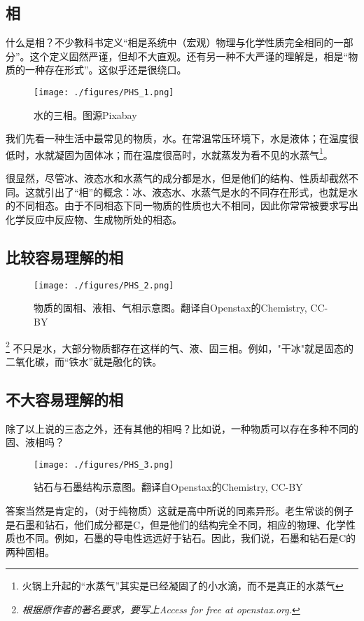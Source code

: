 
\subsection{相}
什么是相？不少教科书定义“相是系统中（宏观）物理与化学性质完全相同的一部分”。这个定义固然严谨，但却不大直观。还有另一种不大严谨的理解是，相是“物质的一种存在形式”。这似乎还是很绕口。

\begin{figure}[ht]
\centering
\texttt{[image: ./figures/PHS\_1.png]}
\caption{水的三相。图源Pixabay} \label{PHS_fig1}
\end{figure}
我们先看一种生活中最常见的物质，水。在常温常压环境下，水是液体；在温度很低时，水就凝固为固体冰；而在温度很高时，水就蒸发为看不见的水蒸气\footnote{火锅上升起的“水蒸气”其实是已经凝固了的小水滴，而不是真正的水蒸气}。

很显然，尽管冰、液态水和水蒸气的成分都是水，但是他们的结构、性质却截然不同。这就引出了“相”的概念：冰、液态水、水蒸气是水的不同存在形式，也就是水的不同相态。由于不同相态下同一物质的性质也大不相同，因此你常常被要求写出化学反应中反应物、生成物所处的相态。

\subsection{比较容易理解的相}
\begin{figure}[ht]
\centering
\texttt{[image: ./figures/PHS\_2.png]}
\caption{物质的固相、液相、气相示意图。翻译自Openstax的Chemistry, CC-BY} \label{PHS_fig2}
\end{figure}
\footnote{\textsl{根据原作者的著名要求，要写上Access for free at openstax.org.}}
不只是水，大部分物质都存在这样的气、液、固三相。例如，"干冰"就是固态的二氧化碳，而“铁水”就是融化的铁。

\subsection{不大容易理解的相}
除了以上说的三态之外，还有其他的相吗？比如说，一种物质可以存在多种不同的固、液相吗？

\begin{figure}[ht]
\centering
\texttt{[image: ./figures/PHS\_3.png]}
\caption{钻石与石墨结构示意图。翻译自Openstax的Chemistry, CC-BY} \label{PHS_fig3}
\end{figure}
答案当然是肯定的，（对于纯物质）这就是高中所说的同素异形。老生常谈的例子是石墨和钻石，他们成分都是C，但是他们的结构完全不同，相应的物理、化学性质也不同。例如，石墨的导电性远远好于钻石。因此，我们说，石墨和钻石是C的两种固相。

